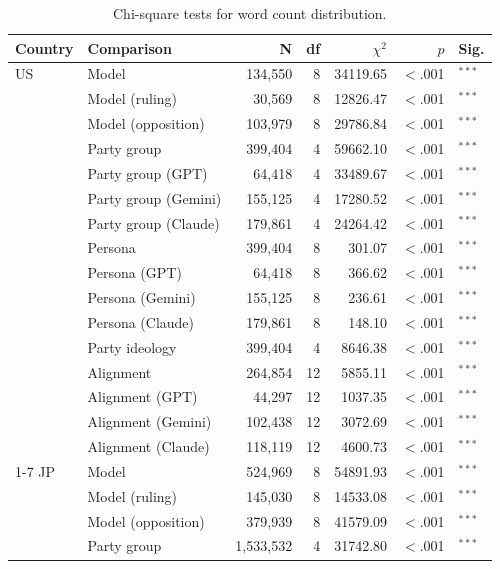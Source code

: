 \begin{table}[t]
\centering
\footnotesize
\setlength{\tabcolsep}{3pt}
\caption{Chi-square tests for word count distribution.}
\label{tab:wc-tests}
\begin{tabular}{llrrrrl}
\toprule
\textbf{Country} & \textbf{Comparison} & \textbf{N} & \textbf{df} & \textbf{$\chi^2$} & \textbf{$p$} & \textbf{Sig.} \\
\midrule
US & Model & 134{,}550 & 8 & 34119.65 & $<$.001 & $^{***}$ \\
 & Model (ruling) & 30{,}569 & 8 & 12826.47 & $<$.001 & $^{***}$ \\
 & Model (opposition) & 103{,}979 & 8 & 29786.84 & $<$.001 & $^{***}$ \\
 & Party group & 399{,}404 & 4 & 59662.10 & $<$.001 & $^{***}$ \\
 & Party group (GPT) & 64{,}418 & 4 & 33489.67 & $<$.001 & $^{***}$ \\
 & Party group (Gemini) & 155{,}125 & 4 & 17280.52 & $<$.001 & $^{***}$ \\
 & Party group (Claude) & 179{,}861 & 4 & 24264.42 & $<$.001 & $^{***}$ \\
 & Persona & 399{,}404 & 8 & 301.07 & $<$.001 & $^{***}$ \\
 & Persona (GPT) & 64{,}418 & 8 & 366.62 & $<$.001 & $^{***}$ \\
 & Persona (Gemini) & 155{,}125 & 8 & 236.61 & $<$.001 & $^{***}$ \\
 & Persona (Claude) & 179{,}861 & 8 & 148.10 & $<$.001 & $^{***}$ \\
 & Party ideology & 399{,}404 & 4 & 8646.38 & $<$.001 & $^{***}$ \\
 & Alignment & 264{,}854 & 12 & 5855.11 & $<$.001 & $^{***}$ \\
 & Alignment (GPT) & 44{,}297 & 12 & 1037.35 & $<$.001 & $^{***}$ \\
 & Alignment (Gemini) & 102{,}438 & 12 & 3072.69 & $<$.001 & $^{***}$ \\
 & Alignment (Claude) & 118{,}119 & 12 & 4600.73 & $<$.001 & $^{***}$ \\
\cmidrule(lr){1-7}
JP & Model & 524{,}969 & 8 & 54891.93 & $<$.001 & $^{***}$ \\
 & Model (ruling) & 145{,}030 & 8 & 14533.08 & $<$.001 & $^{***}$ \\
 & Model (opposition) & 379{,}939 & 8 & 41579.09 & $<$.001 & $^{***}$ \\
 & Party group & 1{,}533{,}532 & 4 & 31742.80 & $<$.001 & $^{***}$ \\

\end{tabular}
\end{table}
